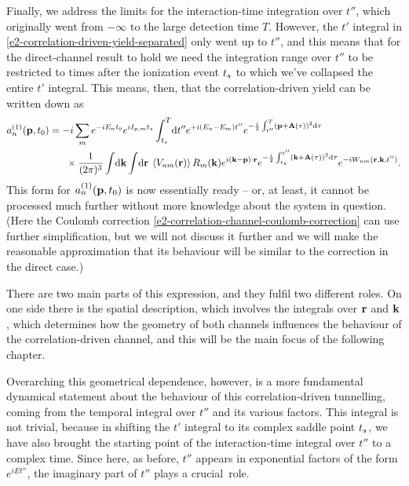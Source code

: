 Finally, we address the limits for the interaction-time integration over $t''$, which originally went from $-\infty$ to the large detection time $T$. However, the $t'$ integral in \eqref{e2-correlation-driven-yield-separated} only went up to $t''$, and this means that for the direct-channel result to hold we need the integration range over $t''$ to be restricted to times after the ionization event ${t_s}$ to which we've collapsed the entire $t'$ integral. This means, then, that the correlation-driven yield can be written down as
\begin{align}
a_n^{(1)}(\vb{p},{t_0})
& =
-i 
\sum_m 
e^{-iE_n {t_0}}
e^{iI_{p,m} {t_s}}
\int_{{t_s}}^T\!\mathrm{d} t''
e^{+i(E_n-E_m)t''}
e^{-\frac{i}{2} \int_{t''}^T\left(\vb{p}+\vb{A}(\tau)\right)^2\mathrm{d}\tau} 
\nonumber \\ & \quad \ \  \times
\frac{1}{(2\pi)^{3}}
\int\!\mathrm{d}\vb{k}
\int\!\mathrm{d}\vb{r} \:
\left\langle V_{nm}\mathopen{}\left( \vb{r} \right)\mathclose{} \right\rangle
R_m(\vb{k})
e^{i\left(\vb{k}-\vb{p}\right)\cdot\vb{r}} 
e^{-\frac{i}{2} \int_{{t_s}}^{t''}\left(\vb{k}+\vb{A}(\tau)\right)^2\mathrm{d}\tau} 
e^{-iW_{nm}(\vb{r},\vb{k},t'')}
.
\label{e2-correlation-driven-yield-semi-final}
\end{align}
This form for $a_n^{(1)}(\vb{p},{t_0})$ is now essentially ready -- or, at least, it cannot be processed much further without more knowledge about the system in question. (Here the Coulomb correction \eqref{e2-correlation-channel-coulomb-correction} can use further simplification, but we will not discuss it further and we will make the reasonable approximation that its behaviour will be similar to the correction in the direct case.) 

There are two main parts of this expression, and they fulfil two different roles. On one side there is the spatial description, which involves the integrals over $\vb{r}$ and $\vb{k}$, which determines how the geometry of both channels influences the behaviour of the correlation-driven channel, and this will be the main focus of the following chapter.

Overarching this geometrical dependence, however, is a more fundamental dynamical statement about the behaviour of this correlation-driven tunnelling, coming from the temporal integral over $t''$ and its various factors. This integral is not trivial, because in shifting the $t'$ integral to its complex saddle point ${t_s}$, we have also brought the starting point of the interaction-time integral over $t''$ to a complex time. Since here, as before, $t''$ appears in exponential factors of the form $e^{iEt''}$, the imaginary part of $t''$ plays a crucial~role.

